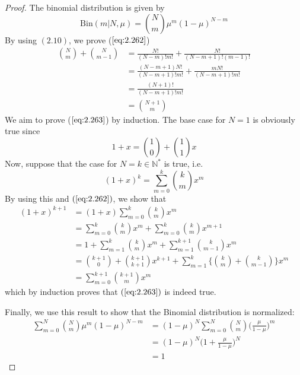 \begin{proof}
    The binomial distribution is given by
    \begin{equation}\label{eq:2.9}\tag{2.9}
        \text{Bin}(m | N, \mu) = \binom{N}{m} \mu^m (1-\mu)^{N - m}
    \end{equation}
    By using $(2.10)$, we prove ($\ref{eq:2.262}$)
    \begin{align*}
        \binom{N}{m} + \binom{N}{m - 1} 
        &= \frac{N!}{(N - m)!m!} + \frac{N!}{(N - m + 1)!(m - 1)!} \\
        &= \frac{(N - m + 1)N!}{(N - m + 1)!m!} + \frac{mN!}{(N - m + 1)!m!} \\
        &= \frac{(N + 1)!}{(N - m + 1)!m!} \\
        &= \binom{N + 1}{m} \tag{2.262}
    \end{align*}
    We aim to prove ($\ref{eq:2.263}$) by induction. The base 
    case for $N=1$ is obviously true since $$1+x = \binom{1}{0} + \binom{1}{1}x$$
    Now, suppose that the case for $N=k \in \mathbb{N}^*$ is true, i.e.
    \[
        (1 + x)^k = \sum_{m=0}^{k} \binom{k}{m} x^m 
    \] 
    By using this and $(\ref{eq:2.262})$, we show that 
    \begin{align*}
        (1 + x)^{k + 1} 
        &= (1 + x) \sum_{m=0}^{k} \binom{k}{m} x^m \\
        &= \sum_{m=0}^{k} \binom{k}{m} x^m + \sum_{m=0}^{k} \binom{k}{m} x^{m+1} \\
        &= 1 + \sum_{m=1}^{k} \binom{k}{m} x^m + \sum_{m=1}^{k + 1} \binom{k}{m - 1} x^m \\
        &= \binom{k+1}{0} + \binom{k+1}{k+1}x^{k + 1} + \sum_{m=1}^{k} \bigg\{\binom{k}{m} + \binom{k}{m-1}\bigg\}x^m \\
        &= \sum_{m=0}^{k+1} \binom{k+1}{m} x^m 
    \end{align*}
    which by induction proves that $(\ref{eq:2.263})$ is indeed true. 

    Finally, we use this result to show that the Binomial distribution is normalized:
    \begin{align*}
        \sum_{m=0}^{N} \binom{N}{m} \mu^m(1 - \mu)^{N - m}
        &= (1 - \mu)^N \sum_{m=0}^{N} \binom{N}{m} \bigg(\frac{\mu}{1 - \mu}\bigg)^m \\
        &= (1 - \mu)^N \bigg(1 + \frac{\mu}{1 - \mu}\bigg)^N \\
        &= 1 \tag{2.264}
    \end{align*}
\end{proof}

